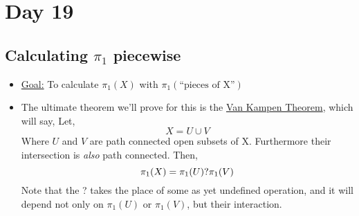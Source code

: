 \documentclass[../notes.tex]{subfiles}
\begin{document}
    \section{Day 19}
        \subsection{Calculating $\pi_1$ piecewise}
        \begin{itemize}
            \item \underline{Goal:} To calculate $\pi_1(X)$ with 
                $\pi_1(\text{``pieces of X''})$
            \item The ultimate theorem we'll prove for this is the 
                \underline{Van Kampen Theorem}, which will say,
                Let,
                \[
                    X=U\cup V
                \]
                Where $U$ and $V$ are path connected open subsets of X. Furthermore
                their intersection is \textit{also} path connected. Then,
                \[
                    \pi_1(X)=\pi_1(U)?\pi_1(V)\\
                \]
                Note that the ? takes the place of some as yet undefined operation,
                and it will depend not only on $\pi_1(U)$ or $\pi_1(V)$, but their
                interaction.
        \end{itemize}
\end{document}
